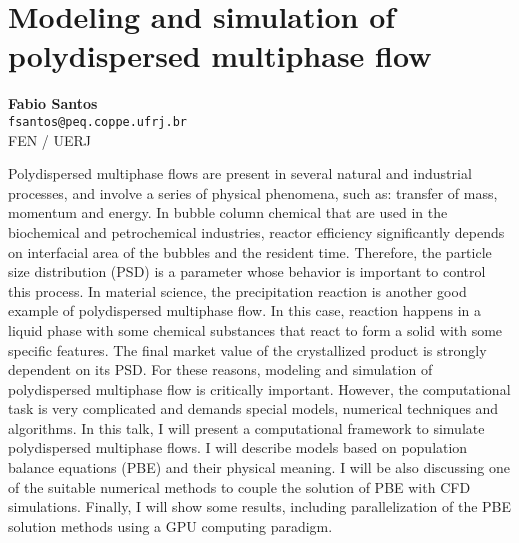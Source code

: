 
\section{Modeling and simulation of polydispersed multiphase flow}

\textbf{Fabio Santos}\\
\texttt{\small{fsantos@peq.coppe.ufrj.br}}\\
FEN / UERJ

Polydispersed multiphase flows are present in several natural and industrial processes, and involve a series of physical phenomena, such as: transfer of mass, momentum and energy. In bubble column chemical that are used in the biochemical and petrochemical industries, reactor efficiency significantly depends on interfacial area of the bubbles and the resident time. Therefore, the particle size distribution (PSD) is a parameter whose behavior is important to control this process. In material science, the precipitation reaction is another good example of polydispersed multiphase flow. In this case, reaction happens in a liquid phase with some chemical substances that react to form a solid with some specific features. The final market value of the crystallized product is strongly dependent on its PSD. For these reasons, modeling and simulation of  polydispersed multiphase  flow is critically important. However, the computational task is very complicated and demands special models, numerical techniques and algorithms. In this talk, I will present a computational framework to simulate polydispersed multiphase flows. I will describe models based on population balance equations (PBE) and their physical meaning. I will be also discussing one of the suitable numerical methods to couple the solution of PBE with CFD simulations. Finally, I will show some results, including parallelization of the PBE solution methods using a GPU computing paradigm.

